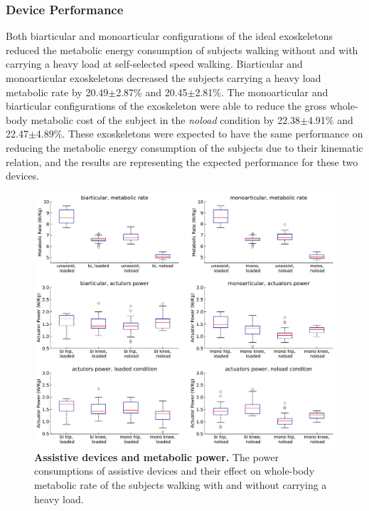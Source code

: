 \documentclass[10pt,letterpaper]{article}
\begin{document}
\subsubsection*{Device Performance}
Both biarticular and monoarticular configurations of the ideal exoskeletons reduced the metabolic energy consumption of subjects walking without and with carrying a heavy load at self-selected speed walking. Biarticular and monoarticular exoskeletons decreased the subjects carrying a heavy load metabolic rate by 20.49$\pm$2.87\% and 20.45$\pm$2.81\%. The monoarticular and biarticular configurations of the exoskeleton were able to reduce the gross whole-body metabolic cost of the subject in the \textit{noload} condition by 22.38$\pm$4.91\% and 22.47$\pm$4.89\%. These exoskeletons were expected to have the same performance on reducing the metabolic energy consumption of the subjects due to their kinematic relation, and the results are representing the expected performance for these two devices.\\
\begin{figure}[ht]   
	\centering
	\includegraphics[width=\linewidth]{Ideal_Exo_MonovsBi_Figures/Paper_Figure_Energy_BoxPlot.pdf}
	\vspace{1mm}
	\caption{\small{\textbf{Assistive devices and metabolic power.} The power consumptions of assistive devices and their effect on whole-body metabolic rate of the subjects walking with and without carrying a heavy load.}}
	\label{Fig_IdealExo_Energy_BoxPlot}
\end{figure}
\end{document}

